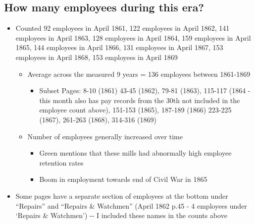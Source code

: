 \documentclass[
  letterpaper,
  DIV=11,
  numbers=noendperiod]{scrartcl}
\providecommand{\tightlist}{%
  \setlength{\itemsep}{0pt}\setlength{\parskip}{0pt}}\usepackage{longtable,booktabs,array}
\begin{document}
\hypertarget{how-many-employees-during-this-era}{%
\subsection{How many employees during this
era?}\label{how-many-employees-during-this-era}}

\begin{itemize}
\item
  Counted 92 employees in April 1861, 122 employees in April 1862, 141
  employees in April 1863, 128 employees in April 1864, 159 employees in
  April 1865, 144 employees in April 1866, 131 employees in April 1867,
  153 employees in April 1868, 153 employees in April 1869

  \begin{itemize}
  \item
    Average across the measured 9 years = 136 employees between
    1861-1869

    \begin{itemize}
    \tightlist
    \item
      Subset Pages: 8-10 (1861) 43-45 (1862), 79-81 (1863), 115-117
      (1864 - this month also has pay records from the 30th not included
      in the employee count above), 151-153 (1865), 187-189 (1866)
      223-225 (1867), 261-263 (1868), 314-316 (1869)
    \end{itemize}
  \item
    Number of employees generally increased over time

    \begin{itemize}
    \tightlist
    \item
      Green mentions that these mills had abnormally high employee
      retention rates
    \item
      Boom in employment towards end of Civil War in 1865
    \end{itemize}
  \end{itemize}
\item
  Some pages have a separate section of employees at the bottom under
  ``Repairs'' and ``Repairs \& Watchmen'' (April 1862 p.45 - 4 employees
  under `Repairs \& Watchmen') -\/- I included these names in the counts
  above


\end{itemize}
\end{document}
